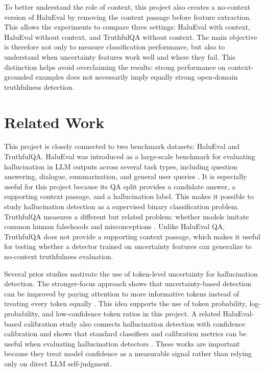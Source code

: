 \documentclass[11pt]{article}
\begin{document}
To better understand the role of context, this project also creates a no-context version of HaluEval by removing the context passage before feature extraction. This allows the experiments to compare three settings: HaluEval with context, HaluEval without context, and TruthfulQA without context. The main objective is therefore not only to measure classification performance, but also to understand when uncertainty features work well and where they fail. This distinction helps avoid overclaiming the results: strong performance on context-grounded examples does not necessarily imply equally strong open-domain truthfulness detection.

\section{Related Work}
\enlargethispage{2\baselineskip}
This project is closely connected to two benchmark datasets: HaluEval and TruthfulQA. HaluEval was introduced as a large-scale benchmark for evaluating hallucination in LLM outputs across several task types, including question answering, dialogue, summarization, and general user queries \cite{li2023halueval}. It is especially useful for this project because its QA split provides a candidate answer, a supporting context passage, and a hallucination label. This makes it possible to study hallucination detection as a supervised binary classification problem. TruthfulQA measures a different but related problem: whether models imitate common human falsehoods and misconceptions \cite{lin2022truthfulqa}. Unlike HaluEval QA, TruthfulQA does not provide a supporting context passage, which makes it useful for testing whether a detector trained on uncertainty features can generalize to no-context truthfulness evaluation.

Several prior studies motivate the use of token-level uncertainty for hallucination detection. The stronger-focus approach shows that uncertainty-based detection can be improved by paying attention to more informative tokens instead of treating every token equally \cite{duan2023strongerfocus}. This idea supports the use of token probability, log-probability, and low-confidence token ratios in this project. A related HaluEval-based calibration study also connects hallucination detection with confidence calibration and shows that standard classifiers and calibration metrics can be useful when evaluating hallucination detectors \cite{calibration2025halueval}. These works are important because they treat model confidence as a measurable signal rather than relying only on direct LLM self-judgment.
\end{document}
